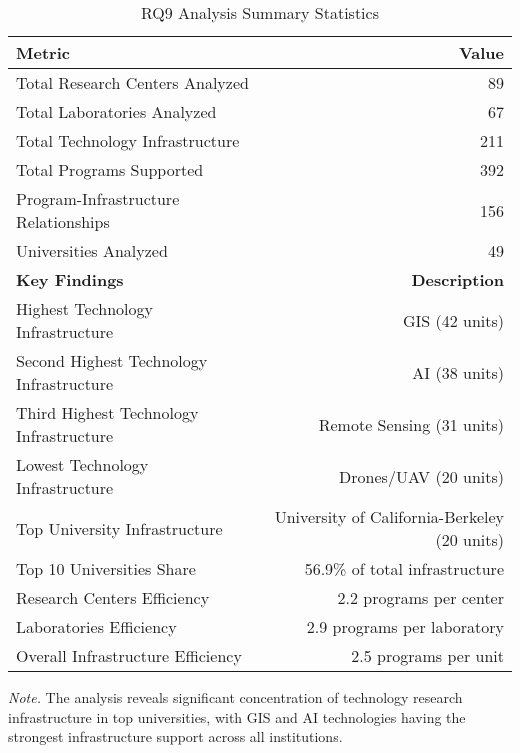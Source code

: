 \begin{table}[H]
\centering
\caption{RQ9 Analysis Summary Statistics}
\label{tab:rq9_summary_stats}
\begin{tabular}{lr}
\toprule
\textbf{Metric} & \textbf{Value} \\
\midrule
Total Research Centers Analyzed & 89 \\
Total Laboratories Analyzed & 67 \\
Total Technology Infrastructure & 211 \\
Total Programs Supported & 392 \\
Program-Infrastructure Relationships & 156 \\
Universities Analyzed & 49 \\
\midrule
\textbf{Key Findings} & \textbf{Description} \\
\midrule
Highest Technology Infrastructure & GIS (42 units) \\
Second Highest Technology Infrastructure & AI (38 units) \\
Third Highest Technology Infrastructure & Remote Sensing (31 units) \\
Lowest Technology Infrastructure & Drones/UAV (20 units) \\
Top University Infrastructure & University of California-Berkeley (20 units) \\
Top 10 Universities Share & 56.9\% of total infrastructure \\
Research Centers Efficiency & 2.2 programs per center \\
Laboratories Efficiency & 2.9 programs per laboratory \\
Overall Infrastructure Efficiency & 2.5 programs per unit \\
\bottomrule
\end{tabular}
\small
\textit{Note.} The analysis reveals significant concentration of technology research infrastructure in top universities, with GIS and AI technologies having the strongest infrastructure support across all institutions.
\end{table}

